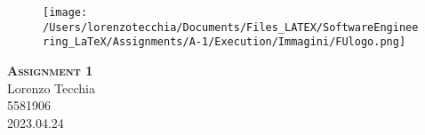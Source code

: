 \documentclass{report}
\begin{document}
\begin{center}
	
\end{center}
    \begin{figure}[htb]
            \centering\texttt{[image: /Users/lorenzotecchia/Documents/Files\_LATEX/SoftwareEngineering\_LaTeX/Assignments/A-1/Execution/Immagini/FUlogo.png]}
    \end{figure}
    

    \begin{center}
        {\scshape\huge\bfseries Assignment 1}\\
        \LARGE Lorenzo Tecchia \\ 5581906 \\ 2023.04.24
    \end{center}


    \newpage
    
    \tableofcontents
    
	
    
    
    
    \printbibliography
    
\end{document}

